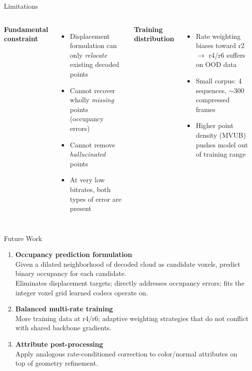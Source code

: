 \documentclass[aspectratio=169]{beamer}
\begin{document}
\begin{frame}{Limitations}
  \begin{columns}[T]
    \textbf{Fundamental constraint}
    \begin{itemize}
      \item Displacement formulation can only \emph{relocate} existing decoded points
      \item Cannot recover wholly \emph{missing} points (occupancy errors)
      \item Cannot remove \emph{hallucinated} points
      \item At very low bitrates, both types of error are present
    \end{itemize}

    \textbf{Training distribution}
    \begin{itemize}
      \item Rate weighting biases toward r2 $\to$ r4/r6 suffers on OOD data
      \item Small corpus: 4 sequences, $\sim$300 compressed frames
      \item Higher point density (MVUB) pushes model out of training range
    \end{itemize}
  \end{columns}
\end{frame}

\begin{frame}{Future Work}
  \begin{enumerate}
    \item \textbf{Occupancy prediction formulation}\\
          Given a dilated neighborhood of decoded cloud as candidate voxels,
          predict binary occupancy for each candidate.\\
          Eliminates displacement targets; directly addresses occupancy errors;
          fits the integer voxel grid learned codecs operate on.

    \vspace{8pt}
    \item \textbf{Balanced multi-rate training}\\
          More training data at r4/r6; adaptive weighting strategies that
          do not conflict with shared backbone gradients.

    \vspace{8pt}
    \item \textbf{Attribute post-processing}\\
          Apply analogous rate-conditioned correction to color/normal attributes
          on top of geometry refinement.
  \end{enumerate}
\end{frame}
\end{document}
